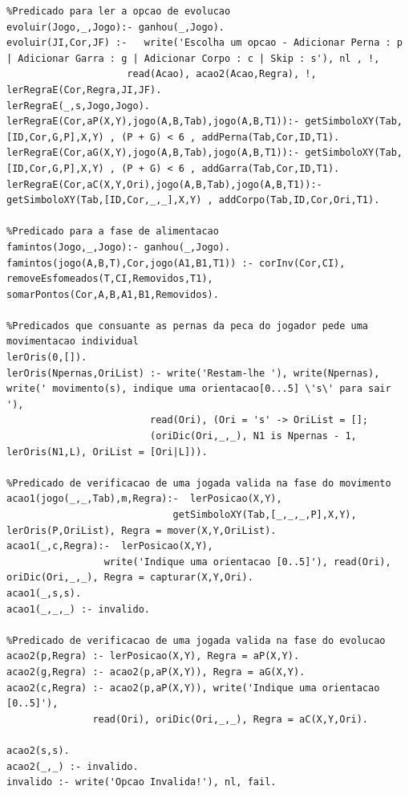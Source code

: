 \documentclass[a4paper]{article}
\begin{document}
\begin{lstlisting}
%Predicado para ler a opcao de evolucao
evoluir(Jogo,_,Jogo):- ganhou(_,Jogo).
evoluir(JI,Cor,JF) :-   write('Escolha um opcao - Adicionar Perna : p | Adicionar Garra : g | Adicionar Corpo : c | Skip : s'), nl , !,
                     read(Acao), acao2(Acao,Regra), !, lerRegraE(Cor,Regra,JI,JF).
lerRegraE(_,s,Jogo,Jogo).
lerRegraE(Cor,aP(X,Y),jogo(A,B,Tab),jogo(A,B,T1)):- getSimboloXY(Tab,[ID,Cor,G,P],X,Y) , (P + G) < 6 , addPerna(Tab,Cor,ID,T1).
lerRegraE(Cor,aG(X,Y),jogo(A,B,Tab),jogo(A,B,T1)):- getSimboloXY(Tab,[ID,Cor,G,P],X,Y) , (P + G) < 6 , addGarra(Tab,Cor,ID,T1).
lerRegraE(Cor,aC(X,Y,Ori),jogo(A,B,Tab),jogo(A,B,T1)):- getSimboloXY(Tab,[ID,Cor,_,_],X,Y) , addCorpo(Tab,ID,Cor,Ori,T1).

%Predicado para a fase de alimentacao
famintos(Jogo,_,Jogo):- ganhou(_,Jogo).
famintos(jogo(A,B,T),Cor,jogo(A1,B1,T1)) :- corInv(Cor,CI), removeEsfomeados(T,CI,Removidos,T1), somarPontos(Cor,A,B,A1,B1,Removidos).

%Predicados que consuante as pernas da peca do jogador pede uma movimentacao individual
lerOris(0,[]).
lerOris(Npernas,OriList) :- write('Restam-lhe '), write(Npernas), write(' movimento(s), indique uma orientacao[0...5] \'s\' para sair '),
                         read(Ori), (Ori = 's' -> OriList = [];
                         (oriDic(Ori,_,_), N1 is Npernas - 1, lerOris(N1,L), OriList = [Ori|L])).

%Predicado de verificacao de uma jogada valida na fase do movimento
acao1(jogo(_,_,Tab),m,Regra):-  lerPosicao(X,Y),
                             getSimboloXY(Tab,[_,_,_,P],X,Y), lerOris(P,OriList), Regra = mover(X,Y,OriList).
acao1(_,c,Regra):-  lerPosicao(X,Y),
                 write('Indique uma orientacao [0..5]'), read(Ori), oriDic(Ori,_,_), Regra = capturar(X,Y,Ori).
acao1(_,s,s).
acao1(_,_,_) :- invalido.

%Predicado de verificacao de uma jogada valida na fase do evolucao
acao2(p,Regra) :- lerPosicao(X,Y), Regra = aP(X,Y).
acao2(g,Regra) :- acao2(p,aP(X,Y)), Regra = aG(X,Y).
acao2(c,Regra) :- acao2(p,aP(X,Y)), write('Indique uma orientacao [0..5]'),
               read(Ori), oriDic(Ori,_,_), Regra = aC(X,Y,Ori).

acao2(s,s).
acao2(_,_) :- invalido.
invalido :- write('Opcao Invalida!'), nl, fail.
\end{lstlisting}
\end{document}
